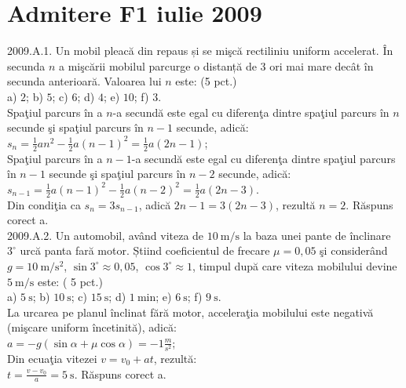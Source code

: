 \section{Admitere F1 iulie 2009}

2009.A.1. Un mobil pleacă din repaus și se mişcă rectiliniu uniform accelerat. În secunda $n$ a mişcării mobilul parcurge o distanță de 3 ori mai mare decât în secunda anterioară. Valoarea lui $n$ este: (5 pct.)\\ a) $2$; b) $5$; c) $6$; d) $4$; e) $10$; f) $3$.\\ Spaţiul parcurs în a $n$-a secundă este egal cu diferenţa dintre spaţiul parcurs în $n$ secunde şi spaţiul parcurs în $n-1$ secunde, adică:\\ $s_{n}=\frac{1}{2} a n^{2}-\frac{1}{2} a(n-1)^{2}=\frac{1}{2} a(2 n-1)$;\\ Spaţiul parcurs în a $n-1$-a secundă este egal cu diferenţa dintre spaţiul parcurs în $n-1$ secunde şi spaţiul parcurs în $n-2$ secunde, adică:\\ $s_{n-1}=\frac{1}{2} a(n-1)^{2}-\frac{1}{2} a(n-2)^{2}=\frac{1}{2} a(2 n-3)$.\\ Din condiţia ca $s_{n}=3 s_{n-1}$, adică $2 n-1=3(2 n-3)$, rezultă $n=2$. Răspuns corect a.\\

2009.A.2. Un automobil, având viteza de $10 \mathrm{~m} / \mathrm{s}$ la baza unei pante de înclinare $3^{\circ}$ urcă panta fară motor. Știind coeficientul de frecare $\mu=0,05$ şi considerând $g=10 \mathrm{~m} / \mathrm{s}^{2}$, $\sin 3^{\circ} \approx 0,05$, $\cos 3^{\circ} \approx 1$, timpul după care viteza mobilului devine $5 \mathrm{~m} / \mathrm{s}$ este: ( 5 pct.)\\ a) $5 \mathrm{~s}$; b) $10 \mathrm{~s}$; c) $15 \mathrm{~s}$; d) $1 \mathrm{~min}$; e) $6 \mathrm{~s}$; f) $9 \mathrm{~s}$.\\ La urcarea pe planul înclinat fără motor, acceleraţia mobilului este negativă (mişcare uniform încetinită), adică:\\ $a=-g(\sin \alpha+\mu \cos \alpha)=-1 \frac{m}{s^{2}}$;\\ Din ecuaţia vitezei $v=v_{0}+a t$, rezultă:\\ $t=\frac{v-v_{0}}{a}=5 \mathrm{~s}$. Răspuns corect a.\\

